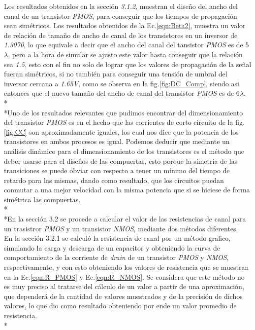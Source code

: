 \documentclass[12pt,a4paper]{article} %
\begin{document}
Los resultados obtenidos en la sección \textit{3.1.2}, muestran el diseño del ancho del canal de un transistor \textit{PMOS}, para conseguir que los tiempos de propagación sean simétricos. Los resultados obtenidos de la Ec.\ref{eqn:Beta2}, muestra un valor de relación de tamaño de ancho de canal de los transistores en un inversor de \textit{1.3070}, lo que equivale a decir que el ancho del canal del tansistor \textit{PMOS} es de 5$\lambda$, pero a la hora de simular se ajusto este valor hasta conseguir que la relación sea \textit{1.5}, esto con el fin no solo de lograr que los valores de propagación de la señal fueran simétricos, si no también para conseguir una tensión de umbral del inversor cercana a \textit{1.65V}, como se observa en la fig.\ref{fig:DC_Comp}, siendo asi entonces que el nuevo tamaño del ancho de canal del transistor \textit{PMOS} es de 6$\lambda$.\\*
\\*Uno de los resultados relevantes que pudimos encontrar del dimensionamiento del transistor \textit{PMOS} es en el hecho que las corrientes de corto circuito de la fig. \ref{fig:CC} son aproximadamente iguales, los cual nos dice que la potencia de los transistores en ambos procesos es igual. Podemos deducir que mediante un análisis dinámico para el dimensionamiento de los transistores es el método que deber usarse para el diseños de las compuertas, esto porque la símetría de las transiciones se puede obviar con respecto a tener un mínimo del tiempo de retardo para las mismas, dando como resultado, que los circuitos puedan conmutar a una mejor velocidad con la misma potencia que si se hiciese de forma simétrica las compuertas.\\*
\\*En la sección 3.2 se procede a calcular el valor de las resistencias de canal para un trasistror \textit{PMOS} y un transistor \textit{NMOS}, mediante dos métodos diferentes. \\

En la sección 3.2.1 se calculó la resistencia de canal por un método grafico, simulando la carga y descarga de un capacitor y obteniendo la curva de comportamiento de la corriente de \textit{drain} de un transistor \textit{PMOS} y \textit{NMOS}, respectivamente, y con esto obteniendo los valores de resistencia que se muestran en la Ec.\ref{eqn:R_PMOS} y Ec.\ref{eqn:R_NMOS}. Se considera que este método no es muy preciso al tratarse del cálculo de un valor a partir de una aproximación, que dependerá de la cantidad de valores muestrados y de la precisión de dichos valores, lo que dio como resultado obteniendo por ende un valor promedio de resistencia.\\*
\end{document}
